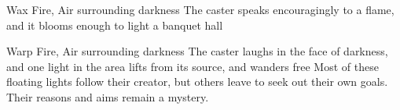   {}%
  {Wax}%
  {Fire, Air}%
  {surrounding darkness}%
  {The caster speaks encouragingly to a flame, and it blooms enough to light a banquet hall}%
  {}

  {}%
  {Warp}%
  {Fire, Air}%
  {surrounding darkness}%
  {The caster laughs in the face of darkness, and one light in the area lifts from its source, and wanders free}%
  {Most of these floating lights follow their creator, but others leave to seek out their own goals.
  Their reasons and aims remain a mystery.}

